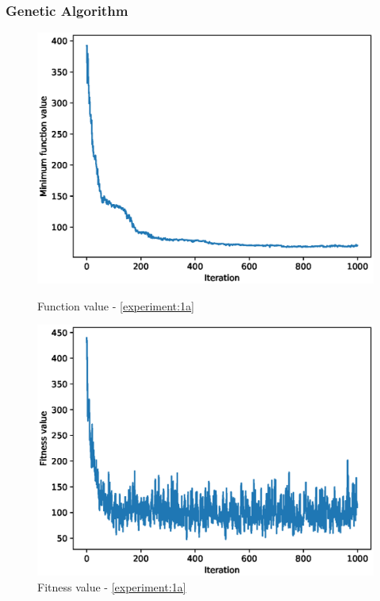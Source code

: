 \documentclass{article}
\begin{document}
\subsubsection{Genetic Algorithm}
\begin{figure}[!htbp]
	\centering
	\begin{minipage}{.48\textwidth}
		\centering
		\includegraphics[scale=.4]{experiment_1a_rastrigin/min_eval_0.eps}
		\caption{Function value - \ref{experiment:1a}}
	\end{minipage}\hfill
	\begin{minipage}{.48\textwidth}
		\centering
		\includegraphics[scale=.4]{experiment_1a_rastrigin/max_fitness_0.eps}
		\caption{Fitness value - \ref{experiment:1a}}
	\end{minipage}
\end{figure}
\FloatBarrier
\end{document}
